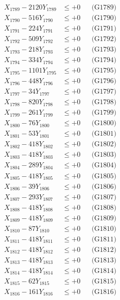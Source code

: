 \documentclass[a4paper,10pt]{article}
\begin{document}
{\begin{align}
X_{1789} - 2120Y_{1789} &\leq +0 && \text{(G1789)} \\
X_{1790} - 516Y_{1790} &\leq +0 && \text{(G1790)} \\
\allowbreak
X_{1791} - 224Y_{1791} &\leq +0 && \text{(G1791)} \\
X_{1792} - 509Y_{1792} &\leq +0 && \text{(G1792)} \\
X_{1793} - 218Y_{1793} &\leq +0 && \text{(G1793)} \\
X_{1794} - 334Y_{1794} &\leq +0 && \text{(G1794)} \\
X_{1795} - 1101Y_{1795} &\leq +0 && \text{(G1795)} \\
X_{1796} - 448Y_{1796} &\leq +0 && \text{(G1796)} \\
X_{1797} - 34Y_{1797} &\leq +0 && \text{(G1797)} \\
X_{1798} - 820Y_{1798} &\leq +0 && \text{(G1798)} \\
X_{1799} - 261Y_{1799} &\leq +0 && \text{(G1799)} \\
X_{1800} - 76Y_{1800} &\leq +0 && \text{(G1800)} \\
\allowbreak
X_{1801} - 53Y_{1801} &\leq +0 && \text{(G1801)} \\
X_{1802} - 418Y_{1802} &\leq +0 && \text{(G1802)} \\
X_{1803} - 418Y_{1803} &\leq +0 && \text{(G1803)} \\
X_{1804} - 289Y_{1804} &\leq +0 && \text{(G1804)} \\
X_{1805} - 418Y_{1805} &\leq +0 && \text{(G1805)} \\
X_{1806} - 39Y_{1806} &\leq +0 && \text{(G1806)} \\
X_{1807} - 293Y_{1807} &\leq +0 && \text{(G1807)} \\
X_{1808} - 418Y_{1808} &\leq +0 && \text{(G1808)} \\
X_{1809} - 418Y_{1809} &\leq +0 && \text{(G1809)} \\
X_{1810} - 87Y_{1810} &\leq +0 && \text{(G1810)} \\
\allowbreak
X_{1811} - 418Y_{1811} &\leq +0 && \text{(G1811)} \\
X_{1812} - 418Y_{1812} &\leq +0 && \text{(G1812)} \\
X_{1813} - 418Y_{1813} &\leq +0 && \text{(G1813)} \\
X_{1814} - 418Y_{1814} &\leq +0 && \text{(G1814)} \\
X_{1815} - 62Y_{1815} &\leq +0 && \text{(G1815)} \\
X_{1816} - 161Y_{1816} &\leq +0 && \text{(G1816)} \\

\end{align}}
\end{document}
